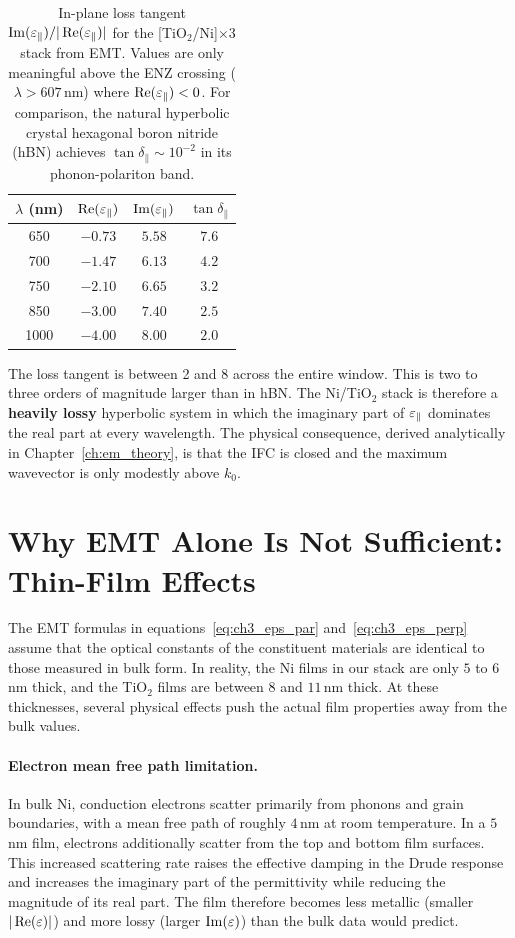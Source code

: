 \begin{table}[h]
\centering
\caption{In-plane loss tangent $\operatorname{Im}(\varepsilon_{\parallel})/|\operatorname{Re}(\varepsilon_{\parallel})|$ for the
  [TiO$_2$/Ni]$\times$3 stack from EMT. Values are only meaningful above the
  ENZ crossing ($\lambda > 607$\,nm) where $\operatorname{Re}(\varepsilon_{\parallel}) < 0$. For comparison,
  the natural hyperbolic crystal hexagonal boron nitride (hBN) achieves
  $\tan\delta_\parallel \sim 10^{-2}$ in its phonon-polariton band.}
\label{tab:ch3_loss_tangent}
\begin{tabular}{cccc}
\toprule
$\lambda$ (nm) & $\operatorname{Re}(\varepsilon_{\parallel})$ & $\operatorname{Im}(\varepsilon_{\parallel})$ & $\tan\delta_\parallel$ \\
\midrule
650  & $-0.73$ & $5.58$ & $7.6$ \\
700  & $-1.47$ & $6.13$ & $4.2$ \\
750  & $-2.10$ & $6.65$ & $3.2$ \\
850  & $-3.00$ & $7.40$ & $2.5$ \\
1000 & $-4.00$ & $8.00$ & $2.0$ \\
\bottomrule
\end{tabular}
\end{table}

The loss tangent is between 2 and 8 across the entire window. This is two to
three orders of magnitude larger than in hBN. The Ni/TiO$_2$ stack is therefore
a \textbf{heavily lossy} hyperbolic system in which the imaginary part of
$\varepsilon_{\parallel}$ dominates the real part at every wavelength. The physical consequence,
derived analytically in Chapter~\ref{ch:em_theory}, is that the IFC is closed
and the maximum wavevector is only modestly above $k_0$.

\section{Why EMT Alone Is Not Sufficient: Thin-Film Effects}

The EMT formulas in equations~\eqref{eq:ch3_eps_par}
and~\eqref{eq:ch3_eps_perp} assume that the optical constants of the
constituent materials are identical to those measured in bulk form. In reality,
the Ni films in our stack are only $5$ to $6$\,nm thick, and the TiO$_2$ films
are between $8$ and $11$\,nm thick. At these thicknesses, several physical
effects push the actual film properties away from the bulk values.

\paragraph{Electron mean free path limitation.}
In bulk Ni, conduction electrons scatter primarily from phonons and grain
boundaries, with a mean free path of roughly $4$\,nm at room temperature. In
a $5$\,nm film, electrons additionally scatter from the top and bottom film
surfaces. This increased scattering rate raises the effective damping in the
Drude response and increases the imaginary part of the permittivity while
reducing the magnitude of its real part. The film therefore becomes less
metallic (smaller $|\operatorname{Re}(\varepsilon)|$) and more lossy (larger $\operatorname{Im}(\varepsilon)$) than the
bulk data would predict.

